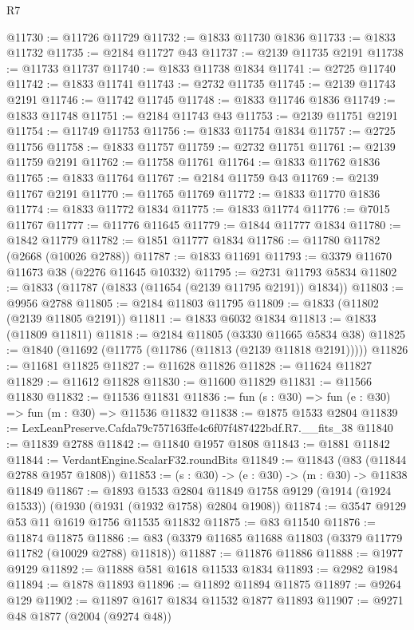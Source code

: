 \begin{lexlean}{R7}
\begin{coremodule}
@11730 := @11726 @11729
@11732 := @1833 @11730 @1836
@11733 := @1833 @11732
@11735 := @2184 @11727 @43
@11737 := @2139 @11735 @2191
@11738 := @11733 @11737
@11740 := @1833 @11738 @1834
@11741 := @2725 @11740
@11742 := @1833 @11741
@11743 := @2732 @11735
@11745 := @2139 @11743 @2191
@11746 := @11742 @11745
@11748 := @1833 @11746 @1836
@11749 := @1833 @11748
@11751 := @2184 @11743 @43
@11753 := @2139 @11751 @2191
@11754 := @11749 @11753
@11756 := @1833 @11754 @1834
@11757 := @2725 @11756
@11758 := @1833 @11757
@11759 := @2732 @11751
@11761 := @2139 @11759 @2191
@11762 := @11758 @11761
@11764 := @1833 @11762 @1836
@11765 := @1833 @11764
@11767 := @2184 @11759 @43
@11769 := @2139 @11767 @2191
@11770 := @11765 @11769
@11772 := @1833 @11770 @1836
@11774 := @1833 @11772 @1834
@11775 := @1833 @11774
@11776 := @7015 @11767
@11777 := @11776 @11645
@11779 := @1844 @11777 @1834
@11780 := @1842 @11779
@11782 := @1851 @11777 @1834
@11786 := @11780 @11782 (@2668 (@10026 @2788))
@11787 := @1833 @11691
@11793 := @3379 @11670 @11673 @38 (@2276 @11645 @10332)
@11795 := @2731 @11793 @5834
@11802 := @1833 (@11787 (@1833 (@11654 (@2139 @11795 @2191)) @1834))
@11803 := @9956 @2788
@11805 := @2184 @11803 @11795
@11809 := @1833 (@11802 (@2139 @11805 @2191))
@11811 := @1833 @6032 @1834
@11813 := @1833 (@11809 @11811)
@11818 := @2184 @11805 (@3330 @11665 @5834 @38)
@11825 := @1840 (@11692 (@11775 (@11786 (@11813 (@2139 @11818 @2191)))))
@11826 := @11681 @11825
@11827 := @11628 @11826
@11828 := @11624 @11827
@11829 := @11612 @11828
@11830 := @11600 @11829
@11831 := @11566 @11830
@11832 := @11536 @11831
@11836 := fun (s : @30) => fun (e : @30) => fun (m : @30) => @11536 @11832
@11838 := @1875 @1533 @2804
@11839 := LexLeanPreserve.Cafda79c757163ffe4c6f07f487422bdf.R7.__fits_38
@11840 := @11839 @2788
@11842 := @11840 @1957 @1808
@11843 := @1881 @11842
@11844 := VerdantEngine.ScalarF32.roundBits
@11849 := @11843 (@83 (@11844 @2788 @1957 @1808))
@11853 := (s : @30) -> (e : @30) -> (m : @30) -> @11838 @11849
@11867 := @1893
    @1533
    @2804
    @11849
    @1758
    @9129
    (@1914 (@1924 @1533))
    (@1930 (@1931 (@1932 @1758) @2804 @1908))
@11874 := @3547 @9129 @53 @11 @1619 @1756 @11535 @11832
@11875 := @83 @11540
@11876 := @11874 @11875
@11886 := @83 (@3379 @11685 @11688 @11803 (@3379 @11779 @11782 (@10029 @2788) @11818))
@11887 := @11876 @11886
@11888 := @1977 @9129
@11892 := @11888 @581 @1618 @11533 @1834
@11893 := @2982 @1984
@11894 := @1878 @11893
@11896 := @11892 @11894 @11875
@11897 := @9264 @129
@11902 := @11897 @1617 @1834 @11532 @1877 @11893
@11907 := @9271 @48 @1877 (@2004 (@9274 @48))

\end{coremodule}
\end{lexlean}
